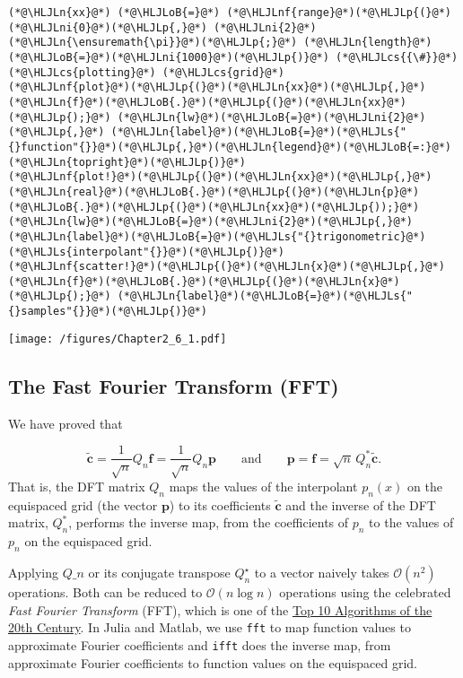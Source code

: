 \documentclass[12pt,a4paper]{article}
\newcommand{\HLJLn}[1]{#1}
\newcommand{\HLJLnf}[1]{\textcolor[RGB]{66,102,213}{#1}}
\newcommand{\HLJLs}[1]{\textcolor[RGB]{201,61,57}{#1}}
\newcommand{\HLJLni}[1]{\textcolor[RGB]{59,151,46}{#1}}
\newcommand{\HLJLoB}[1]{\textcolor[RGB]{102,102,102}{\textbf{#1}}}
\newcommand{\HLJLp}[1]{#1}
\newcommand{\HLJLcs}[1]{\textcolor[RGB]{153,153,119}{\textit{#1}}}
\begin{document}
\begin{lstlisting}
(*@\HLJLn{xx}@*) (*@\HLJLoB{=}@*) (*@\HLJLnf{range}@*)(*@\HLJLp{(}@*)(*@\HLJLni{0}@*)(*@\HLJLp{,}@*) (*@\HLJLni{2}@*)(*@\HLJLn{\ensuremath{\pi}}@*)(*@\HLJLp{;}@*) (*@\HLJLn{length}@*)(*@\HLJLoB{=}@*)(*@\HLJLni{1000}@*)(*@\HLJLp{)}@*) (*@\HLJLcs{{\#}}@*) (*@\HLJLcs{plotting}@*) (*@\HLJLcs{grid}@*)
(*@\HLJLnf{plot}@*)(*@\HLJLp{(}@*)(*@\HLJLn{xx}@*)(*@\HLJLp{,}@*) (*@\HLJLn{f}@*)(*@\HLJLoB{.}@*)(*@\HLJLp{(}@*)(*@\HLJLn{xx}@*)(*@\HLJLp{);}@*) (*@\HLJLn{lw}@*)(*@\HLJLoB{=}@*)(*@\HLJLni{2}@*)(*@\HLJLp{,}@*) (*@\HLJLn{label}@*)(*@\HLJLoB{=}@*)(*@\HLJLs{"{}function"{}}@*)(*@\HLJLp{,}@*)(*@\HLJLn{legend}@*)(*@\HLJLoB{=:}@*)(*@\HLJLn{topright}@*)(*@\HLJLp{)}@*)
(*@\HLJLnf{plot!}@*)(*@\HLJLp{(}@*)(*@\HLJLn{xx}@*)(*@\HLJLp{,}@*) (*@\HLJLn{real}@*)(*@\HLJLoB{.}@*)(*@\HLJLp{(}@*)(*@\HLJLn{p}@*)(*@\HLJLoB{.}@*)(*@\HLJLp{(}@*)(*@\HLJLn{xx}@*)(*@\HLJLp{));}@*) (*@\HLJLn{lw}@*)(*@\HLJLoB{=}@*)(*@\HLJLni{2}@*)(*@\HLJLp{,}@*) (*@\HLJLn{label}@*)(*@\HLJLoB{=}@*)(*@\HLJLs{"{}trigonometric}@*) (*@\HLJLs{interpolant"{}}@*)(*@\HLJLp{)}@*)
(*@\HLJLnf{scatter!}@*)(*@\HLJLp{(}@*)(*@\HLJLn{x}@*)(*@\HLJLp{,}@*) (*@\HLJLn{f}@*)(*@\HLJLoB{.}@*)(*@\HLJLp{(}@*)(*@\HLJLn{x}@*)(*@\HLJLp{);}@*) (*@\HLJLn{label}@*)(*@\HLJLoB{=}@*)(*@\HLJLs{"{}samples"{}}@*)(*@\HLJLp{)}@*)
\end{lstlisting}

\texttt{[image: /figures/Chapter2\_6\_1.pdf]}

\subsection{The Fast Fourier Transform (FFT)}
We have proved that

\[
\tilde{\mathbf{c}} =  \frac{1}{\sqrt{n}}Q_{n}\mathbf{f} =  \frac{1}{\sqrt{n}}Q_{n}\mathbf{p} \qquad \text{and} \qquad \mathbf{p} = \mathbf{f} = \sqrt{n}\,Q_{n}^*\tilde{\mathbf{c}}.
\]
That is, the DFT matrix $Q_n$ maps the values of the interpolant $p_n(x)$ on the equispaced grid (the vector $\mathbf{p}$) to its coefficients $\tilde{\mathbf{c}}$ and the inverse of the DFT matrix, $Q_{n}^*$, performs the inverse map, from the coefficients of $p_n$ to the values of $p_n$ on the equispaced grid.

Applying $Q\ensuremath{\_n}$ or its conjugate transpose $Q_n^\ensuremath{\star}$ to a vector naively takes $\mathcal{O}(n^2)$ operations. Both can be reduced to $\mathcal{O}(n \log n)$ operations using the celebrated \emph{Fast Fourier Transform} (FFT), which is one of the \href{https://pi.math.cornell.edu/~web6140/}{Top 10 Algorithms of the 20th Century}.  In Julia and Matlab, we use \texttt{fft} to map function values to approximate Fourier coefficients and \texttt{ifft} does the inverse map, from approximate Fourier coefficients to function values on the equispaced grid.
\end{document}
